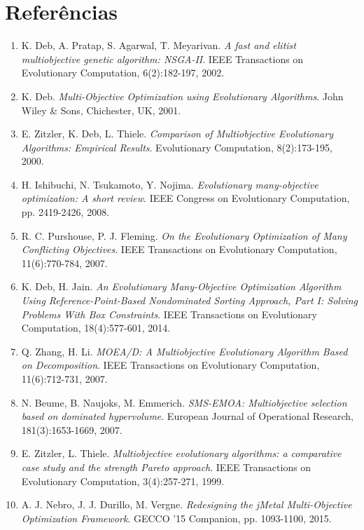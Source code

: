 \section*{Referências}

\begin{enumerate}
  \item K. Deb, A. Pratap, S. Agarwal, T. Meyarivan. \textit{A fast and elitist multiobjective genetic algorithm: NSGA-II}. IEEE Transactions on Evolutionary Computation, 6(2):182-197, 2002.
  
  \item K. Deb. \textit{Multi-Objective Optimization using Evolutionary Algorithms}. John Wiley \& Sons, Chichester, UK, 2001.
  
  \item E. Zitzler, K. Deb, L. Thiele. \textit{Comparison of Multiobjective Evolutionary Algorithms: Empirical Results}. Evolutionary Computation, 8(2):173-195, 2000.
  
  \item H. Ishibuchi, N. Tsukamoto, Y. Nojima. \textit{Evolutionary many-objective optimization: A short review}. IEEE Congress on Evolutionary Computation, pp. 2419-2426, 2008.
  
  \item R. C. Purshouse, P. J. Fleming. \textit{On the Evolutionary Optimization of Many Conflicting Objectives}. IEEE Transactions on Evolutionary Computation, 11(6):770-784, 2007.
  
  \item K. Deb, H. Jain. \textit{An Evolutionary Many-Objective Optimization Algorithm Using Reference-Point-Based Nondominated Sorting Approach, Part I: Solving Problems With Box Constraints}. IEEE Transactions on Evolutionary Computation, 18(4):577-601, 2014.
  
  \item Q. Zhang, H. Li. \textit{MOEA/D: A Multiobjective Evolutionary Algorithm Based on Decomposition}. IEEE Transactions on Evolutionary Computation, 11(6):712-731, 2007.
  
  \item N. Beume, B. Naujoks, M. Emmerich. \textit{SMS-EMOA: Multiobjective selection based on dominated hypervolume}. European Journal of Operational Research, 181(3):1653-1669, 2007.
  
  \item E. Zitzler, L. Thiele. \textit{Multiobjective evolutionary algorithms: a comparative case study and the strength Pareto approach}. IEEE Transactions on Evolutionary Computation, 3(4):257-271, 1999.
  
  \item A. J. Nebro, J. J. Durillo, M. Vergne. \textit{Redesigning the jMetal Multi-Objective Optimization Framework}. GECCO '15 Companion, pp. 1093-1100, 2015.
\end{enumerate}
